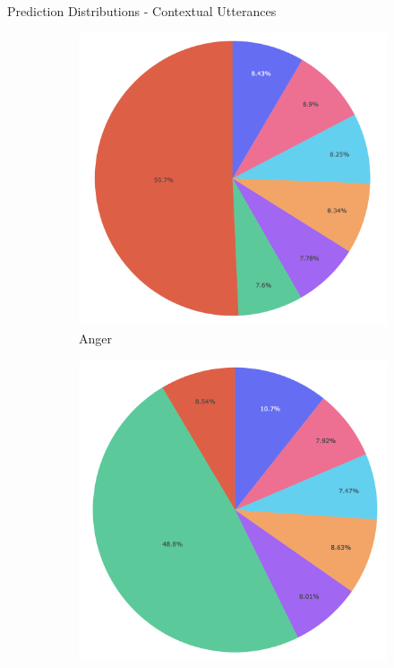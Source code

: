 \documentclass[11pt,aspectratio=169]{beamer}
\begin{document}
\begin{frame}{Prediction Distributions - Contextual Utterances}
\begin{figure}[!ht]
\begin{subfigure}{0.19\textwidth}
      \includegraphics[width=\linewidth]{figures/anger_context.png}
      \caption*{Anger}
    \end{subfigure}\hfil
    \begin{subfigure}{0.19\textwidth}
      \includegraphics[width=\linewidth]{figures/disgust_context.png}

\end{subfigure}
\end{figure}
\end{frame}
\end{document}
